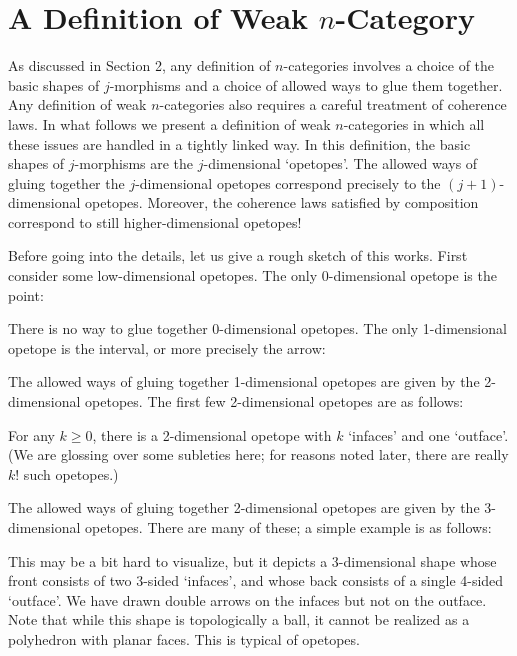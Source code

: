 \section{A Definition of Weak $n$-Category}

As discussed in Section 2, any definition of $n$-categories involves a
choice of the basic shapes of $j$-morphisms and a choice of allowed ways
to glue them together.  Any definition of weak $n$-categories also
requires a careful treatment of coherence laws.  In what follows we
present a definition of weak $n$-categories in which all these issues
are handled in a tightly linked way.  In this definition, the basic
shapes of $j$-morphisms are the $j$-dimensional `opetopes'.  The allowed
ways of gluing together the $j$-dimensional opetopes correspond
precisely to the $(j+1)$-dimensional opetopes.  Moreover, the coherence
laws satisfied by composition correspond to still higher-dimensional
opetopes!

Before going into the details, let us give a rough sketch of this works.
First consider some low-dimensional opetopes.  The only 0-dimensional
opetope is the point:

\medskip
\centerline{\epsfysize=0.08in}
\medskip

\noindent There is no way to glue together 0-dimensional opetopes.  The
only 1-dimensional opetope is the interval, or more precisely the arrow:

\medskip
\centerline{\epsfysize=0.12in}
\medskip

\noindent The allowed ways of gluing together 1-dimensional opetopes are
given by the 2-dimensional opetopes.  The first few 2-dimensional
opetopes are as follows:

\medskip
\centerline{\epsfysize=0.8in}
\medskip
 
\noindent For any $k \ge 0$, there is a 2-dimensional opetope with $k$
`infaces' and one `outface'.  (We are glossing over some subleties here;
for reasons noted later, there are really $k!$ such opetopes.)

The allowed ways of gluing together 2-dimensional opetopes are
given by the 3-dimensional opetopes.  There are many of these; a simple
example is as follows:

\medskip
\centerline{\epsfysize=1.2in}
\medskip

\noindent This may be a bit hard to visualize, but it depicts a
3-dimensional shape whose front consists of two 3-sided `infaces', and
whose back consists of a single 4-sided `outface'.  We have drawn double
arrows on the infaces but not on the outface.  Note that while this shape is
topologically a ball, it cannot be realized as a polyhedron with
planar faces.  This is typical of opetopes.   

